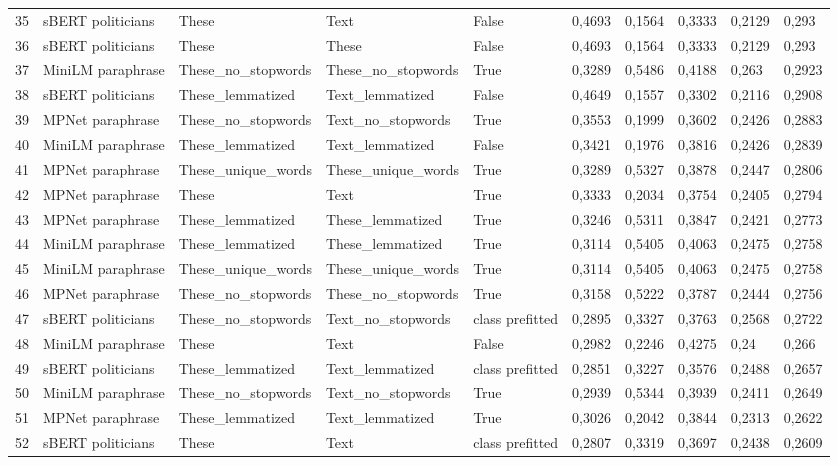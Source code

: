 \begin{tabular}{llllllllll}
35 & sBERT politicians & These & Text & False & 0,4693 & 0,1564 & 0,3333 & 0,2129 & 0,293 \\
36 & sBERT politicians & These & These & False & 0,4693 & 0,1564 & 0,3333 & 0,2129 & 0,293 \\
37 & MiniLM paraphrase & These_no_stopwords & These_no_stopwords & True & 0,3289 & 0,5486 & 0,4188 & 0,263 & 0,2923 \\
38 & sBERT politicians & These_lemmatized & Text_lemmatized & False & 0,4649 & 0,1557 & 0,3302 & 0,2116 & 0,2908 \\
39 & MPNet paraphrase & These_no_stopwords & Text_no_stopwords & True & 0,3553 & 0,1999 & 0,3602 & 0,2426 & 0,2883 \\
40 & MiniLM paraphrase & These_lemmatized & Text_lemmatized & False & 0,3421 & 0,1976 & 0,3816 & 0,2426 & 0,2839 \\
41 & MPNet paraphrase & These_unique_words & These_unique_words & True & 0,3289 & 0,5327 & 0,3878 & 0,2447 & 0,2806 \\
42 & MPNet paraphrase & These & Text & True & 0,3333 & 0,2034 & 0,3754 & 0,2405 & 0,2794 \\
43 & MPNet paraphrase & These_lemmatized & These_lemmatized & True & 0,3246 & 0,5311 & 0,3847 & 0,2421 & 0,2773 \\
44 & MiniLM paraphrase & These_lemmatized & These_lemmatized & True & 0,3114 & 0,5405 & 0,4063 & 0,2475 & 0,2758 \\
45 & MiniLM paraphrase & These_unique_words & These_unique_words & True & 0,3114 & 0,5405 & 0,4063 & 0,2475 & 0,2758 \\
46 & MPNet paraphrase & These_no_stopwords & These_no_stopwords & True & 0,3158 & 0,5222 & 0,3787 & 0,2444 & 0,2756 \\
47 & sBERT politicians & These_no_stopwords & Text_no_stopwords & class prefitted & 0,2895 & 0,3327 & 0,3763 & 0,2568 & 0,2722 \\
48 & MiniLM paraphrase & These & Text & False & 0,2982 & 0,2246 & 0,4275 & 0,24 & 0,266 \\
49 & sBERT politicians & These_lemmatized & Text_lemmatized & class prefitted & 0,2851 & 0,3227 & 0,3576 & 0,2488 & 0,2657 \\
50 & MiniLM paraphrase & These_no_stopwords & Text_no_stopwords & True & 0,2939 & 0,5344 & 0,3939 & 0,2411 & 0,2649 \\
51 & MPNet paraphrase & These_lemmatized & Text_lemmatized & True & 0,3026 & 0,2042 & 0,3844 & 0,2313 & 0,2622 \\
52 & sBERT politicians & These & Text & class prefitted & 0,2807 & 0,3319 & 0,3697 & 0,2438 & 0,2609 \\

\end{tabular}
